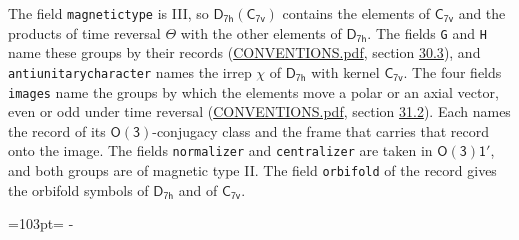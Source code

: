 \documentclass[10pt,a4paper]{article}
\newcommand{\needspace}[1]{\par\penalty-100\begingroup\dimen0=#1\relax\dimen2=\pagegoal
  \advance\dimen2-\pagetotal\ifdim\dimen0>\dimen2\relax\ifdim\dimen2>0pt\vfil\break\fi\fi
  \endgroup}
\numberwithin{equation}{section}
\newcommand{\grp}[1]{\mathsf{#1}}
\begin{document}
The field \texttt{magnetictype} is III, so $\grp{D_{7h}}(\grp{C_{7v}})$ contains the elements of $\grp{C_{7v}}$ and the products of time reversal $\varTheta$ with the other elements of $\grp{D_{7h}}$. The fields \texttt{G} and \texttt{H} name these groups by their records (\href{../../CONVENTIONS.pdf}{CONVENTIONS.pdf}, section \href{../../CONVENTIONS.pdf\#conv.30.3}{30.3}), and \texttt{antiunitarycharacter} names the irrep $\chi$ of $\grp{D_{7h}}$ with kernel $\grp{C_{7v}}$. The four fields \texttt{images} name the groups by which the elements move a polar or an axial vector, even or odd under time reversal (\href{../../CONVENTIONS.pdf}{CONVENTIONS.pdf}, section \href{../../CONVENTIONS.pdf\#conv.31.2}{31.2}). Each names the record of its $\grp{O(3)}$-conjugacy class and the frame that carries that record onto the image. The fields \texttt{normalizer} and \texttt{centralizer} are taken in $\grp{O(3)1'}$, and both groups are of magnetic type II. The field \texttt{orbifold} of the record gives the orbifold symbols of $\grp{D_{7h}}$ and of $\grp{C_{7v}}$.
\needspace{103pt}
\end{document}
